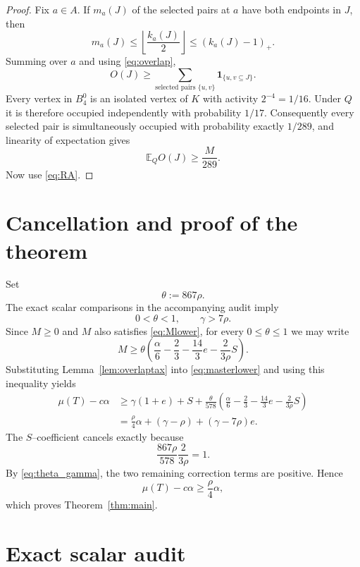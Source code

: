 \documentclass[11pt]{article}
\newcommand{\E}{\mathbb E}
\begin{document}
\begin{proof}
Fix $a\in A$.  If $m_a(J)$ of the selected pairs at $a$ have both endpoints in $J$, then
\[
 m_a(J)\le \left\lfloor\frac{k_a(J)}2\right\rfloor
 \le (k_a(J)-1)_+.
\]
Summing over $a$ and using \eqref{eq:overlap},
\[
 O(J)\ge\sum_{\text{selected pairs }\{u,v\}}
 \mathbf 1_{\{u,v\subseteq J\}}.
\]
Every vertex in $B_4^0$ is an isolated vertex of $K$ with activity $2^{-4}=1/16$.
Under $Q$ it is therefore occupied independently with probability $1/17$.
Consequently every selected pair is simultaneously occupied with probability exactly $1/289$, and linearity of expectation gives
\[
 \E_QO(J)\ge\frac{M}{289}.
\]
Now use \eqref{eq:RA}.
\end{proof}

\section{Cancellation and proof of the theorem}

Set
\[
 \theta:=867\rho.
\]
The exact scalar comparisons in the accompanying audit imply
\begin{equation}\label{eq:theta_gamma}
 0<\theta<1,
 \qquad
 \gamma>7\rho.
\end{equation}
Since $M\ge0$ and $M$ also satisfies \eqref{eq:Mlower}, for every $0\le\theta\le1$ we may write
\[
 M\ge \theta\left(
 \frac{\alpha}{6}-\frac23-\frac{14}{3}e
 -\frac{2}{3\rho}S
 \right).
\]
Substituting Lemma~\ref{lem:overlaptax} into \eqref{eq:masterlower} and using this inequality yields
\begin{align*}
 \mu(T)-c\alpha
 &\ge \gamma(1+e)+S
 +\frac{\theta}{578}
 \left(
 \frac{\alpha}{6}-\frac23-\frac{14}{3}e
 -\frac{2}{3\rho}S
 \right)\\
 &=\frac{\rho}{4}\alpha
 +(\gamma-\rho)
 +(\gamma-7\rho)e.
\end{align*}
The $S$--coefficient cancels exactly because
\[
 \frac{867\rho}{578}\frac{2}{3\rho}=1.
\]
By \eqref{eq:theta_gamma}, the two remaining correction terms are positive.  Hence
\[
 \mu(T)-c\alpha\ge\frac{\rho}{4}\alpha,
\]
which proves Theorem~\ref{thm:main}.

\section{Exact scalar audit}
\end{document}
